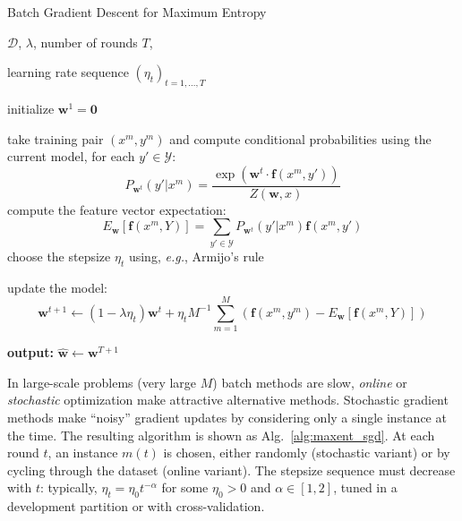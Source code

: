 \begin{algorithm}[t]

   \caption{Batch Gradient Descent for Maximum Entropy \label{alg:maxent_gd}}

\begin{algorithmic}[1]

    $\mathcal{D}$, $\lambda$, number of rounds $T$,

   learning rate sequence $(\eta_t)_{t = 1,\ldots,T}$

   \STATE initialize $\boldsymbol{w}^1 = \mathbf{0}$

	\STATE take training pair $(x^m, y^m)$ and compute conditional probabilities using the current model, for each $y' \in \mathcal{Y}$:
	$$P_{\boldsymbol{w}^t}(y'|x^m) = \frac{\exp(\boldsymbol{w}^t \cdot \boldsymbol{f}(x^m,y'))}{Z(\boldsymbol{w},x)}$$ 
	\STATE compute the feature vector expectation:  
	$$E_{\boldsymbol{w}}[\boldsymbol{f}(x^m,Y)] = \sum_{y' \in \mathcal{Y}} P_{\boldsymbol{w}^t}(y'|x^m) \boldsymbol{f}(x^m,y')$$
	\ENDFOR
	\STATE choose the stepsize $\eta_t$ using, \emph{e.g.}, Armijo's rule

	\STATE update the model: 
	$$\boldsymbol{w}^{t+1} \leftarrow (1-\lambda \eta_t) \boldsymbol{w}^{t} + \eta_t M^{-1} \sum_{m=1}^M \left( \boldsymbol{f}(x^{m},y^{m}) 
	- E_{\boldsymbol{w}}[\boldsymbol{f}(x^{m},Y)]\right)$$
	\ENDFOR

   \STATE \textbf{output:} $\hat{\boldsymbol{w}} \leftarrow \boldsymbol{w}^{T+1}$

\end{algorithmic}

\end{algorithm}

 

In large-scale problems (very large $M$) batch methods are slow, 
\emph{online} or \emph{stochastic} optimization make attractive alternative methods. Stochastic gradient methods make ``noisy'' gradient updates 
by considering only a single instance at the time. The resulting algorithm is shown as Alg.~\ref{alg:maxent_sgd}. 
At each round $t$, an instance $m(t)$ is chosen, either randomly  (stochastic variant) or by cycling through the dataset (online variant). 
The stepsize sequence must decrease with $t$: typically, $\eta_t = \eta_0 t^{-\alpha}$ for some $\eta_0 > 0$ and $\alpha \in [1, 2]$, tuned 
in a development partition or with cross-validation. 

